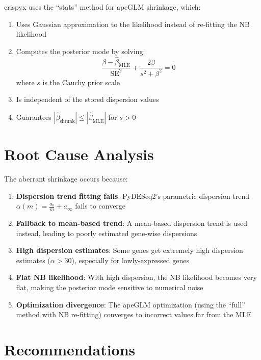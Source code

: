 \documentclass{article}
\begin{document}
crispyx uses the ``stats'' method for apeGLM shrinkage, which:
\begin{enumerate}
    \item Uses Gaussian approximation to the likelihood instead of re-fitting the NB likelihood
    \item Computes the posterior mode by solving:
    \begin{equation}
        \frac{\beta - \hat{\beta}_{\text{MLE}}}{\text{SE}^2} + \frac{2\beta}{s^2 + \beta^2} = 0
    \end{equation}
    where $s$ is the Cauchy prior scale
    \item Is independent of the stored dispersion values
    \item Guarantees $|\hat{\beta}_{\text{shrunk}}| \leq |\hat{\beta}_{\text{MLE}}|$ for $s > 0$
\end{enumerate}

\section{Root Cause Analysis}

The aberrant shrinkage occurs because:

\begin{enumerate}
    \item \textbf{Dispersion trend fitting fails}: PyDESeq2's parametric dispersion trend $\alpha(m) = \frac{a_0}{m} + a_\infty$ fails to converge
    
    \item \textbf{Fallback to mean-based trend}: A mean-based dispersion trend is used instead, leading to poorly estimated gene-wise dispersions
    
    \item \textbf{High dispersion estimates}: Some genes get extremely high dispersion estimates ($\alpha > 30$), especially for lowly-expressed genes
    
    \item \textbf{Flat NB likelihood}: With high dispersion, the NB likelihood becomes very flat, making the posterior mode sensitive to numerical noise
    
    \item \textbf{Optimization divergence}: The apeGLM optimization (using the ``full'' method with NB re-fitting) converges to incorrect values far from the MLE
\end{enumerate}

\section{Recommendations}
\end{document}
